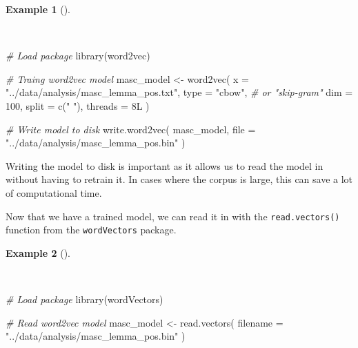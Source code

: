 \documentclass[
  letterpaper,
  DIV=11,
  numbers=noendperiod]{scrreprt}
\newenvironment{Shaded}{\begin{snugshade}}{\end{snugshade}}
\newcommand{\AttributeTok}[1]{\textcolor[rgb]{0.00,0.00,0.00}{#1}}
\newcommand{\CommentTok}[1]{\textcolor[rgb]{0.00,0.00,0.00}{\textit{#1}}}
\newcommand{\DecValTok}[1]{\textcolor[rgb]{0.00,0.00,0.00}{#1}}
\newcommand{\FunctionTok}[1]{\textcolor[rgb]{0.00,0.00,0.00}{#1}}
\newcommand{\NormalTok}[1]{\textcolor[rgb]{0.00,0.00,0.00}{#1}}
\newcommand{\OtherTok}[1]{\textcolor[rgb]{0.00,0.00,0.00}{#1}}
\newcommand{\StringTok}[1]{\textcolor[rgb]{0.00,0.00,0.00}{#1}}
\theoremstyle{definition}
\newtheorem{example}{Example}[chapter]
\theoremstyle{remark}
\begin{document}
\begin{example}[]\protect\hypertarget{exm-eda-masc-vsm-word2vec-train}{}\label{exm-eda-masc-vsm-word2vec-train}

~

\begin{Shaded}
\begin{Highlighting}[]
\CommentTok{\# Load package}
\FunctionTok{library}\NormalTok{(word2vec)}

\CommentTok{\# Traing word2vec model}
\NormalTok{masc\_model }\OtherTok{\textless{}{-}}
  \FunctionTok{word2vec}\NormalTok{(}
    \AttributeTok{x =} \StringTok{"../data/analysis/masc\_lemma\_pos.txt"}\NormalTok{,}
    \AttributeTok{type =} \StringTok{"cbow"}\NormalTok{, }\CommentTok{\# or "skip{-}gram"}
    \AttributeTok{dim =} \DecValTok{100}\NormalTok{,}
    \AttributeTok{split =} \FunctionTok{c}\NormalTok{(}\StringTok{" "}\NormalTok{),}
    \AttributeTok{threads =} \DecValTok{8}\NormalTok{L}
\NormalTok{  )}

\CommentTok{\# Write model to disk}
\FunctionTok{write.word2vec}\NormalTok{(}
\NormalTok{  masc\_model,}
  \AttributeTok{file =} \StringTok{"../data/analysis/masc\_lemma\_pos.bin"}
\NormalTok{)}
\end{Highlighting}
\end{Shaded}

\end{example}

Writing the model to disk is important as it allows us to read the model
in without having to retrain it. In cases where the corpus is large,
this can save a lot of computational time.

Now that we have a trained model, we can read it in with the
\texttt{read.vectors()} function from the \texttt{wordVectors} package.

\begin{example}[]\protect\hypertarget{exm-eda-masc-vsm-word2vec-read}{}\label{exm-eda-masc-vsm-word2vec-read}

~

\begin{Shaded}
\begin{Highlighting}[]
\CommentTok{\# Load package}
\FunctionTok{library}\NormalTok{(wordVectors)}

\CommentTok{\# Read word2vec model}
\NormalTok{masc\_model }\OtherTok{\textless{}{-}}
  \FunctionTok{read.vectors}\NormalTok{(}
    \AttributeTok{filename =} \StringTok{"../data/analysis/masc\_lemma\_pos.bin"}
\NormalTok{  )}
\end{Highlighting}
\end{Shaded}

\end{example}
\end{document}
